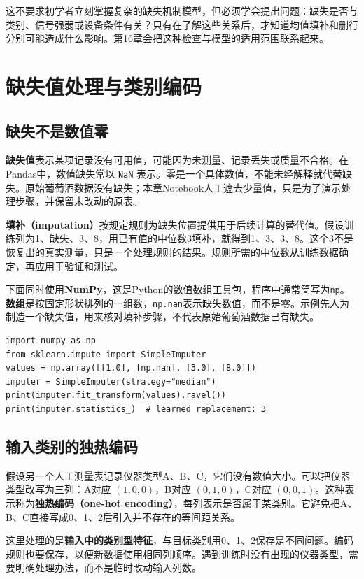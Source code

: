 这不要求初学者立刻掌握复杂的缺失机制模型，但必须学会提出问题：缺失是否与类别、信号强弱或设备条件有关？只有在了解这些关系后，才知道均值填补和删行分别可能造成什么影响。第16章会把这种检查与模型的适用范围联系起来。

\section{缺失值处理与类别编码}
\subsection{缺失不是数值零}
\textbf{缺失值}表示某项记录没有可用值，可能因为未测量、记录丢失或质量不合格。在Pandas中，数值缺失常以 \texttt{NaN} 表示。零是一个具体数值，不能未经解释就代替缺失。原始葡萄酒数据没有缺失；本章Notebook人工遮去少量值，只是为了演示处理步骤，并保留未改动的原表。

\textbf{填补（imputation）}按规定规则为缺失位置提供用于后续计算的替代值。假设训练列为1、缺失、3、8，用已有值的中位数3填补，就得到1、3、3、8。这个3不是恢复出的真实测量，只是一个处理规则的结果。规则所需的中位数从训练数据确定，再应用于验证和测试。

下面同时使用\textbf{NumPy}，这是Python的数值数组工具包，程序中通常简写为\texttt{np}。\textbf{数组}是按固定形状排列的一组数，\texttt{np.nan}表示缺失数值，而不是零。示例先人为制造一个缺失值，用来核对填补步骤，不代表原始葡萄酒数据已有缺失。

\begin{lstlisting}[caption={先手算，再用软件核对中位数填补}]
import numpy as np
from sklearn.impute import SimpleImputer
values = np.array([[1.0], [np.nan], [3.0], [8.0]])
imputer = SimpleImputer(strategy="median")
print(imputer.fit_transform(values).ravel())
print(imputer.statistics_)  # learned replacement: 3
\end{lstlisting}

\subsection{输入类别的独热编码}
假设另一个人工测量表记录仪器类型A、B、C，它们没有数值大小。可以把仪器类型改写为三列：A对应 $(1,0,0)$，B对应 $(0,1,0)$，C对应 $(0,0,1)$。这种表示称为\textbf{独热编码（one-hot encoding）}，每列表示是否属于某类别。它避免把A、B、C直接写成0、1、2后引入并不存在的等间距关系。

这里处理的是\textbf{输入中的类别型特征}，与目标类别用0、1、2保存是不同问题。编码规则也要保存，以便新数据使用相同列顺序。遇到训练时没有出现的仪器类型，需要明确处理办法，而不是临时改动输入列数。

